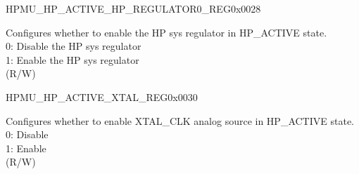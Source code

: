     \begin{register}{H}{PMU\_HP\_ACTIVE\_HP\_REGULATOR0\_REG}{0x0028}\label{regdesc:PMUHPACTIVEHPREGULATOR0REG}
    \regnewline%
    \begin{regdesc}\begin{reglist}
    \label{fielddesc:PMUHPACTIVEHPREGULATORXPD}\item [PMU\_HP\_ACTIVE\_HP\_REGULATOR\_XPD] Configures whether to enable the HP sys regulator in HP\_ACTIVE state.\\ 
0: Disable the HP sys regulator\\
1: Enable the HP sys regulator\\
(R/W)
    \end{reglist}\end{regdesc}
    \end{register}


    \begin{register}{H}{PMU\_HP\_ACTIVE\_XTAL\_REG}{0x0030}\label{regdesc:PMUHPACTIVEXTALREG}
    \regnewline%
    \begin{regdesc}\begin{reglist}
    \label{fielddesc:PMUHPACTIVEXPDXTAL}\item [PMU\_HP\_ACTIVE\_XPD\_XTAL] Configures whether to enable XTAL\_CLK analog source in HP\_ACTIVE state.\\ 
0: Disable\\
1: Enable\\
(R/W)
    \end{reglist}\end{regdesc}
    \end{register}

